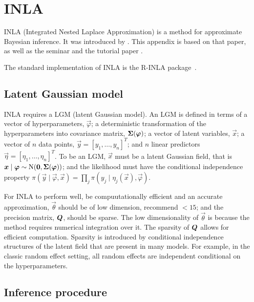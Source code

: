 \documentclass[thesis.tex]{subfiles}
\begin{document}
\chapter{INLA} \label{transmission:sec:INLA}


INLA (Integrated Nested Laplace Approximation) is a method for approximate Bayesian inference.
It was introduced by \textcite{rueINLA}.
This appendix is based on that paper, as well as the seminar \textcite{rueINLAseminar} and the tutorial paper \textcite{martinoINLAtutorial}.

The standard implementation of INLA is the R-INLA package~\autocite{RINLA}.

\section{Latent Gaussian model}

INLA requires a LGM (latent Gaussian model).
An LGM is defined in terms of a vector of hyperparameters, $\vec{\varphi}$; a deterministic transformation of the hyperparameters into covariance matrix, $\bm{\Sigma}(\bm{\varphi})$; a vector of latent variables, $\vec{x}$; a vector of $n$ data points, $\vec{y} = [y_1, \dots, y_n]^T$; and $n$ linear predictors $\vec{\eta} = [\eta_1, \dots, \eta_n]^T$.
To be an LGM, $\vec{x}$ must be a latent Gaussian field, that is $\bm{x} \mid \bm{\varphi} \sim \operatorname{N}(\bm{0}, \bm{\Sigma}(\bm{\varphi}))$; and the likelihood must have the conditional independence property $\pi(\vec{y} \mid \vec{\varphi}, \vec{x}) = \prod_j \pi(y_j \mid \eta_j(\vec{x}), \vec{\varphi})$.

For INLA to perform well, \ie be compuutationally efficient and an accurate approximation, $\vec{\theta}$ should be of low dimension, \textcite{martinoINLAtutorial} recommend $< 15$; and the precision matrix, $\bm{Q}$, should be sparse.
The low dimensionality of $\vec{\theta}$ is because the method requires numerical integration over it.
The sparsity of $\bm{Q}$ allows for efficient computation.
Sparsity is introduced by conditional independence structures of the latent field that are present in many models.
For example, in the classic random effect setting, all random effects are independent conditional on the hyperparameters.

\section{Inference procedure} \label{transmission:sec:INLA:inference}
\end{document}
